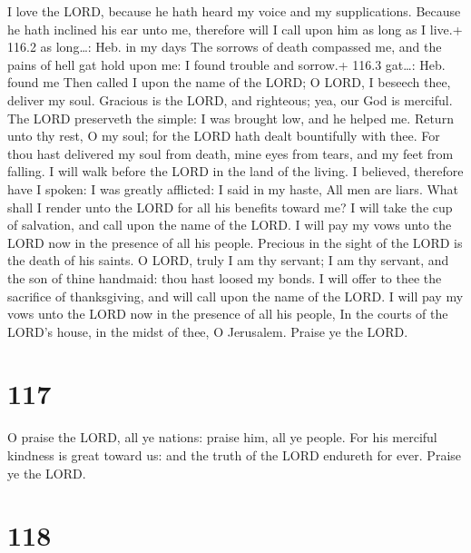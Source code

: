  I love the LORD, because he hath heard my voice and my
supplications.  Because he hath inclined his ear unto me,
therefore will I call upon him as long as I live.+ 116.2 as long\ldots:
Heb. in my days  The sorrows of death compassed me, and the
pains of hell gat hold upon me: I found trouble and sorrow.+ 116.3
gat\ldots: Heb. found me  Then called I upon the name of the
LORD; O LORD, I beseech thee, deliver my soul.  Gracious is
the LORD, and righteous; yea, our God is merciful.  The LORD
preserveth the simple: I was brought low, and he helped me. 
Return unto thy rest, O my soul; for the LORD hath dealt bountifully
with thee.  For thou hast delivered my soul from death, mine
eyes from tears, and my feet from falling.  I will walk
before the LORD in the land of the living.  I believed,
therefore have I spoken: I was greatly afflicted:  I said
in my haste, All men are liars.  What shall I render unto
the LORD for all his benefits toward me?  I will take the
cup of salvation, and call upon the name of the LORD.  I
will pay my vows unto the LORD now in the presence of all his people.
 Precious in the sight of the LORD is the death of his
saints.  O LORD, truly I am thy servant; I am thy servant,
and the son of thine handmaid: thou hast loosed my bonds. 
I will offer to thee the sacrifice of thanksgiving, and will call upon
the name of the LORD.  I will pay my vows unto the LORD now
in the presence of all his people,  In the courts of the
LORD's house, in the midst of thee, O Jerusalem. Praise ye the LORD.

\hypertarget{section-116}{%
\section{117}\label{section-116}}

 O praise the LORD, all ye nations: praise him, all ye
people.  For his merciful kindness is great toward us: and
the truth of the LORD endureth for ever. Praise ye the LORD.

\hypertarget{section-117}{%
\section{118}\label{section-117}}

